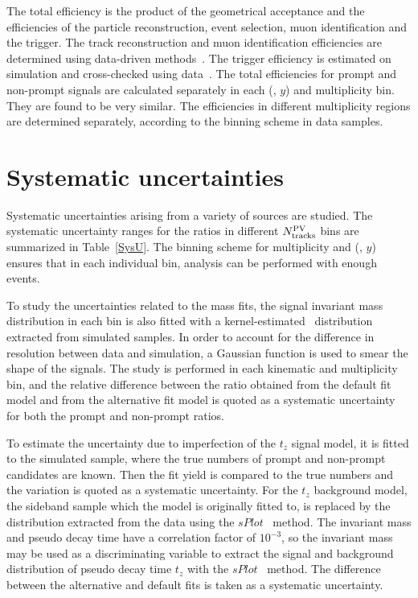 \documentclass[12pt,a4paper]{article}
\begin{document}
The total efficiency \effTot is the product of the geometrical acceptance and the efficiencies of the particle reconstruction, event selection, muon identification and the trigger. The track reconstruction and muon identification efficiencies are determined using data-driven methods~\cite{Anderlini:2202412,LHCb-DP-2013-002}. The trigger efficiency is estimated on simulation and cross-checked using data~\cite{Tolk:2014llp}. The total efficiencies for prompt and non-prompt signals are calculated separately in each (\pt, $y$) and multiplicity bin. They are found to be very similar.
The efficiencies in different multiplicity regions are determined separately, according to the binning scheme in data samples.


\section{Systematic uncertainties}
\def\effTri{\ensuremath{\epsilon_{\mathrm{trigger}}}\xspace}
\def\effTotJ{\ensuremath{\epsilon_{\mathrm{tot,\jpsi}}}\xspace}
\def\effTotP{\ensuremath{\epsilon_{\mathrm{tot,\psitwos}}}\xspace}
\def\pandb{prompt components and components from $b$-hadron decay}
Systematic uncertainties arising from a variety of sources are studied. The systematic uncertainty ranges for the ratios in different $N_{\rm tracks}^{\rm PV}$ bins are summarized in Table~\ref{SysU}. The binning scheme for multiplicity and (\pt, $y$) ensures that in each individual bin, analysis can be performed with enough events.

To study the uncertainties related to the mass fits, the signal invariant mass distribution in each bin is also fitted with a kernel-estimated~\cite{Cranmer:2000du} distribution extracted from simulated samples. In order to account for the difference in resolution between data and simulation, a Gaussian function is used to smear the shape of the signals. The study is performed in each kinematic and multiplicity bin, and the relative difference between the ratio obtained from the default fit model and from the alternative fit model is quoted as a systematic uncertainty for both the prompt and non-prompt ratios.

To estimate the uncertainty due to imperfection of the $t_z$ signal model, it is fitted to the simulated sample, where the true numbers of prompt and non-prompt candidates are known. Then the fit yield is compared to the true numbers and the variation is quoted as a systematic uncertainty. For the $t_z$ background model, the sideband sample which the model is originally fitted to, is replaced by the distribution extracted from the data using the $sPlot$~\cite{Pivk:2004ty} method. The invariant mass and pseudo decay time have a correlation factor of $10^{-3}$, so the invariant mass may be used as a discriminating variable to extract the signal and background distribution of pseudo decay time $t_z$ with the $sPlot$~\cite{Pivk:2004ty} method. The difference between the alternative and default fits is taken as a systematic uncertainty.
\end{document}
